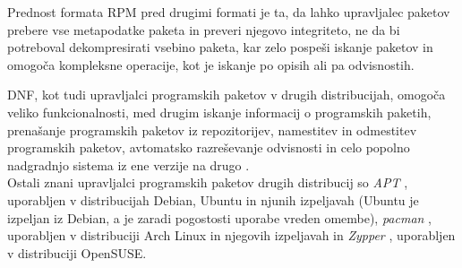 Prednost formata RPM pred drugimi formati je ta, da lahko upravljalec paketov prebere vse metapodatke paketa in preveri
njegovo integriteto, ne da bi potreboval dekompresirati vsebino paketa, kar zelo pospeši iskanje paketov in omogoča
kompleksne operacije, kot je iskanje po opisih ali pa odvisnostih.

DNF, kot tudi upravljalci programskih paketov v drugih distribucijah,
omogoča veliko funkcionalnosti, med drugim iskanje informacij o programskih paketih, prenašanje programskih
paketov iz repozitorijev, namestitev in odmestitev programskih paketov, avtomatsko razreševanje odvisnosti in celo
popolno nadgradnjo sistema iz ene verzije na drugo \cite{fedora-dnf}.\\

Ostali znani upravljalci programskih paketov drugih distribucij so \emph{APT} \cite{ubuntu-pm},
uporabljen v distribucijah Debian, Ubuntu in njunih izpeljavah (Ubuntu je izpeljan iz Debian,
a je zaradi pogostosti uporabe vreden omembe), \emph{pacman} \cite{arch-pm}, uporabljen v distribuciji Arch Linux
in njegovih izpeljavah in \emph{Zypper} \cite{opensuse-pm}, uporabljen v distribuciji OpenSUSE.